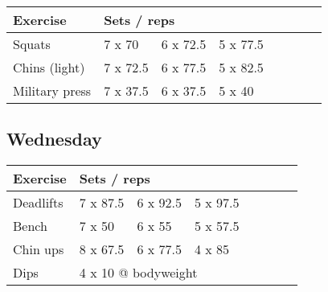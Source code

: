 \documentclass[12pt, a4paper]{article}%
\begin{document}
  \begin{tabular}{l|lllllll}
  \hspace{0.75em} \textbf{Exercise} & \multicolumn{ 7 }{l}{ \textbf{Sets / reps} } \\ \hline

            \hspace{0.75em} Squats
            & 7 x 70
            & 6 x 72.5
            & 5 x 77.5
            & 
            & 
            & 
            & 
            \\


            \hspace{0.75em} Chins (light)
            & 7 x 72.5
            & 6 x 77.5
            & 5 x 82.5
            & 
            & 
            & 
            & 
            \\


            \hspace{0.75em} Military press
            & 7 x 37.5
            & 6 x 37.5
            & 5 x 40
            & 
            & 
            & 
            & 
            \\


  \end{tabular}

  \subsection*{\hspace{0.5em} Wednesday }


  \begin{tabular}{l|lllllll}
  \hspace{0.75em} \textbf{Exercise} & \multicolumn{ 7 }{l}{ \textbf{Sets / reps} } \\ \hline

            \hspace{0.75em} Deadlifts
            & 7 x 87.5
            & 6 x 92.5
            & 5 x 97.5
            & 
            & 
            & 
            & 
            \\


            \hspace{0.75em} Bench
            & 7 x 50
            & 6 x 55
            & 5 x 57.5
            & 
            & 
            & 
            & 
            \\


            \hspace{0.75em} Chin ups
            & 8 x 67.5
            & 6 x 77.5
            & 4 x 85
            & 
            & 
            & 
            & 
            \\


   \hspace{0.75em} Dips &  \multicolumn{ 7 }{l}{ 4 x 10 @ bodyweight } \\
  \end{tabular}
\end{document}
